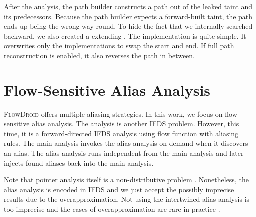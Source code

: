 \documentclass[../draft.tex]{subfiles}
\begin{document}
    After the analysis, the path builder constructs a path out of the leaked taint and its predecessors. Because the path builder expects a forward-built taint, the path ends up being the wrong way round. To hide the fact that we internally searched backward, we also created a  extending . The implementation is quite simple. It overwrites only the  implementations to swap the start and end. If full path reconstruction is enabled, it also reverses the path in between.

    \section{Flow-Sensitive Alias Analysis}\label{s:aliasing}
    \textsc{FlowDroid} offers multiple aliasing strategies.
    In this work, we focus on flow-sensitive alias analysis. The analysis is another IFDS problem. However, this time, it is a forward-directed IFDS analysis using flow function with aliasing rules. The main analysis invokes the alias analysis on-demand when it discovers an alias. The alias analysis runs independent from the main analysis and later injects found aliases back into the main analysis.

    Note that pointer analysis itself is a non-distributive problem \cite{Arzt2017PhD, Spaeth2016}. Nonetheless, the alias analysis is encoded in IFDS and we just accept the possibly imprecise results due to the overapproximation. Not using the intertwined alias analysis is too imprecise and the cases of overapproximation are rare in practice \cite{Arzt2017PhD}.
\end{document}
